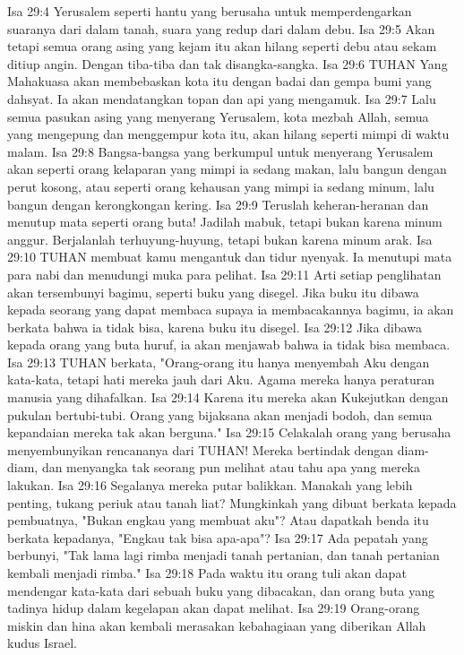 Isa 29:4  Yerusalem seperti hantu yang berusaha untuk memperdengarkan suaranya dari dalam tanah, suara yang redup dari dalam debu.
Isa 29:5  Akan tetapi semua orang asing yang kejam itu akan hilang seperti debu atau sekam ditiup angin. Dengan tiba-tiba dan tak disangka-sangka.
Isa 29:6  TUHAN Yang Mahakuasa akan membebaskan kota itu dengan badai dan gempa bumi yang dahsyat. Ia akan mendatangkan topan dan api yang mengamuk.
Isa 29:7  Lalu semua pasukan asing yang menyerang Yerusalem, kota mezbah Allah, semua yang mengepung dan menggempur kota itu, akan hilang seperti mimpi di waktu malam.
Isa 29:8  Bangsa-bangsa yang berkumpul untuk menyerang Yerusalem akan seperti orang kelaparan yang mimpi ia sedang makan, lalu bangun dengan perut kosong, atau seperti orang kehausan yang mimpi ia sedang minum, lalu bangun dengan kerongkongan kering.
Isa 29:9  Teruslah keheran-heranan dan menutup mata seperti orang buta! Jadilah mabuk, tetapi bukan karena minum anggur. Berjalanlah terhuyung-huyung, tetapi bukan karena minum arak.
Isa 29:10  TUHAN membuat kamu mengantuk dan tidur nyenyak. Ia menutupi mata para nabi dan menudungi muka para pelihat.
Isa 29:11  Arti setiap penglihatan akan tersembunyi bagimu, seperti buku yang disegel. Jika buku itu dibawa kepada seorang yang dapat membaca supaya ia membacakannya bagimu, ia akan berkata bahwa ia tidak bisa, karena buku itu disegel.
Isa 29:12  Jika dibawa kepada orang yang buta huruf, ia akan menjawab bahwa ia tidak bisa membaca.
Isa 29:13  TUHAN berkata, "Orang-orang itu hanya menyembah Aku dengan kata-kata, tetapi hati mereka jauh dari Aku. Agama mereka hanya peraturan manusia yang dihafalkan.
Isa 29:14  Karena itu mereka akan Kukejutkan dengan pukulan bertubi-tubi. Orang yang bijaksana akan menjadi bodoh, dan semua kepandaian mereka tak akan berguna."
Isa 29:15  Celakalah orang yang berusaha menyembunyikan rencananya dari TUHAN! Mereka bertindak dengan diam-diam, dan menyangka tak seorang pun melihat atau tahu apa yang mereka lakukan.
Isa 29:16  Segalanya mereka putar balikkan. Manakah yang lebih penting, tukang periuk atau tanah liat? Mungkinkah yang dibuat berkata kepada pembuatnya, "Bukan engkau yang membuat aku"? Atau dapatkah benda itu berkata kepadanya, "Engkau tak bisa apa-apa"?
Isa 29:17  Ada pepatah yang berbunyi, "Tak lama lagi rimba menjadi tanah pertanian, dan tanah pertanian kembali menjadi rimba."
Isa 29:18  Pada waktu itu orang tuli akan dapat mendengar kata-kata dari sebuah buku yang dibacakan, dan orang buta yang tadinya hidup dalam kegelapan akan dapat melihat.
Isa 29:19  Orang-orang miskin dan hina akan kembali merasakan kebahagiaan yang diberikan Allah kudus Israel.
